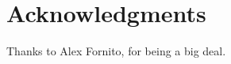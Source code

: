 \documentclass[10pt,letterpaper]{article}
\begin{document}
\section*{Acknowledgments}
Thanks to Alex Fornito, for being a big deal.

\nolinenumbers

%
%
%






\end{document}
